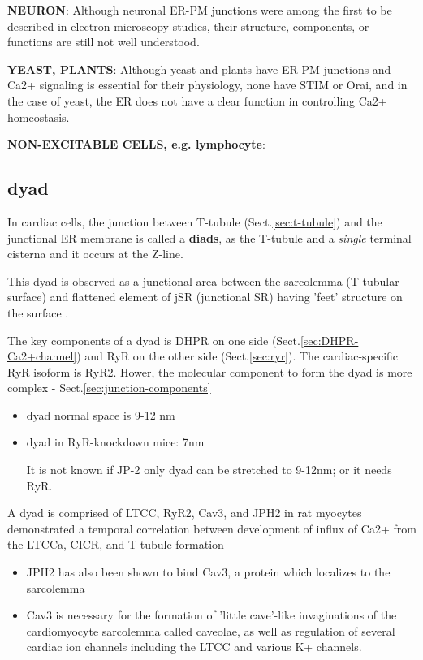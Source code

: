 {\bf NEURON}: Although neuronal ER-PM junctions were among the first to be
described in electron microscopy studies, their structure, components, or
functions are still not well understood.

{\bf YEAST, PLANTS}: Although yeast and plants have ER-PM junctions and Ca2+
signaling is essential for their physiology, none have STIM or Orai, and in the
case of yeast, the ER does not have a clear function in controlling Ca2+
homeostasis.

{\bf NON-EXCITABLE CELLS, e.g. lymphocyte}: 


\subsection{dyad}
\label{sec:dyad}

In cardiac cells, the junction between T-tubule (Sect.\ref{sec:t-tubule}) and
the junctional ER membrane is called a {\bf diads}, as the T-tubule and a {\it
single} terminal cisterna and it occurs at the Z-line.

This dyad is observed as a junctional area between the sarcolemma (T-tubular
surface) and flattened element of jSR (junctional SR) having 'feet' structure on
the surface \citep{carl1995}. 

The key components of a dyad is DHPR on one side
(Sect.\ref{sec:DHPR-Ca2+channel}) and RyR on the other side
(Sect.\ref{sec:ryr}). The cardiac-specific RyR isoform is RyR2.
Hower, the molecular component to form the dyad is more complex -
Sect.\ref{sec:junction-components}
\begin{itemize}
  \item dyad normal space is 9-12 nm
  
  \item dyad in RyR-knockdown mice: 7nm

It is not known if JP-2 only dyad can be stretched to 9-12nm; or it needs RyR.

\end{itemize}

A dyad is comprised of LTCC, RyR2, Cav3, and JPH2 in rat myocytes demonstrated a
temporal correlation between development of influx of Ca2+ from the LTCCa, CICR,
and T-tubule formation
\begin{itemize} 
  \item  JPH2 has also been shown to bind Cav3, a protein which localizes to the
sarcolemma

  \item Cav3 is necessary for the formation of 'little cave'-like invaginations
  of the cardiomyocyte sarcolemma called caveolae, as well as regulation of
  several cardiac ion channels including the LTCC and various K+ channels.
 
\end{itemize}

